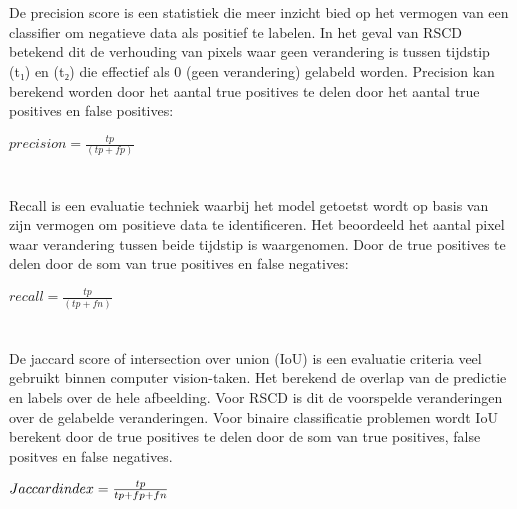 \section{}%
\label{sec:precision-score}
De precision score is een statistiek die meer inzicht bied op het vermogen van een classifier om negatieve data als positief te labelen.
In het geval van RSCD betekend dit de verhouding van pixels waar geen verandering is tussen tijdstip (t₁) en (t₂) die effectief als 0 
(geen verandering) gelabeld worden. Precision kan berekend worden door het aantal true positives te delen door het aantal true positives
en false positives: 
\newline
\begin{center} 
\(precision = \frac{tp}{(tp + fp)}\) 
\end{center}

\section{}%
\label{sec:recall-score}
Recall is een evaluatie techniek waarbij het model getoetst wordt op basis van zijn vermogen om positieve data te identificeren. 
Het beoordeeld het aantal pixel waar verandering tussen beide tijdstip is waargenomen. Door de true positives te delen door de som van 
true positives en false negatives: 
\newline
\begin{center} 
\(recall = \frac{tp}{(tp + fn)}\) 
\end{center}

\section{}%
\label{sec:iou-score}
De jaccard score of intersection over union (IoU) is een evaluatie criteria veel gebruikt binnen computer vision-taken. Het berekend
de overlap van de predictie en labels over de hele afbeelding. Voor RSCD is dit de voorspelde veranderingen over de gelabelde veranderingen.
Voor binaire classificatie problemen wordt IoU berekent door de true positives te delen door de som van true positives, false positves en false negatives.
\newline
\begin{center}
\(Jaccard \space index = \frac{tp}{tp + fp + fn} \)
\end{center}

